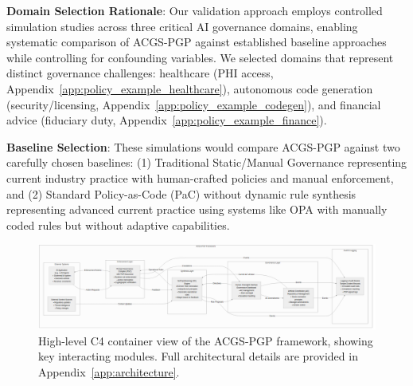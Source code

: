 \documentclass[sigconf,review,anonymous=false]{acmart} %
\begin{document}
\textbf{Domain Selection Rationale}: Our validation approach employs controlled simulation studies across three critical AI governance domains, enabling systematic comparison of ACGS-PGP against established baseline approaches while controlling for confounding variables. We selected domains that represent distinct governance challenges: healthcare (PHI access, Appendix~\ref{app:policy_example_healthcare}), autonomous code generation (security/licensing, Appendix~\ref{app:policy_example_codegen}), and financial advice (fiduciary duty, Appendix~\ref{app:policy_example_finance}).

\textbf{Baseline Selection}: These simulations would compare ACGS-PGP against two carefully chosen baselines: (1) Traditional Static/Manual Governance representing current industry practice with human-crafted policies and manual enforcement, and (2) Standard Policy-as-Code (PaC) without dynamic rule synthesis representing advanced current practice using systems like OPA with manually coded rules but without adaptive capabilities.

\begin{figure}[t]
  \centering
  \includegraphics[width=0.9\columnwidth]{figures/figure1_c4_architecture.png}
  \caption{High-level C4 container view of the ACGS-PGP framework, showing key interacting modules. Full architectural details are provided in Appendix~\ref{app:architecture}.}
  \label{fig:c4_architecture}
\end{figure}
\end{document}
